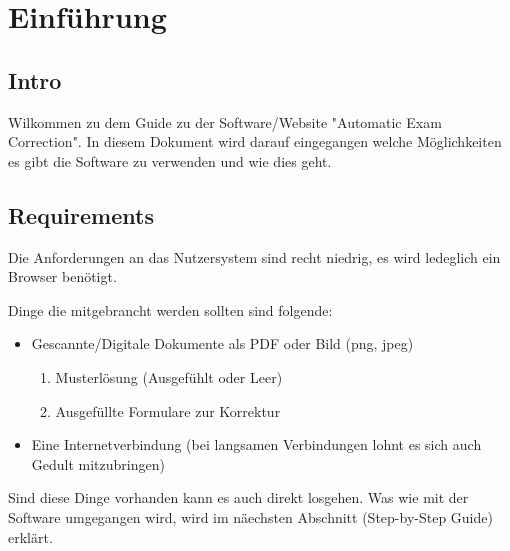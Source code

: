 \chapter{Einf\"uhrung}

\section{Intro}

Wilkommen zu dem Guide zu der Software/Website "Automatic Exam Correction".
In diesem Dokument wird darauf eingegangen welche M\"oglichkeiten es gibt die Software zu verwenden und wie dies geht.

\section{Requirements}

Die Anforderungen an das Nutzersystem sind recht niedrig, es wird ledeglich ein Browser ben\"otigt.

Dinge die mitgebrancht werden sollten sind folgende:
\begin{itemize}
	\item Gescannte/Digitale Dokumente als PDF oder Bild (png, jpeg)
		\begin{enumerate}
			\item Musterl\"osung (Ausgef\"uhlt oder Leer)
			\item Ausgef\"ullte Formulare zur Korrektur
		\end{enumerate}
	\item Eine Internetverbindung (bei langsamen Verbindungen lohnt es sich auch Gedult mitzubringen)
\end{itemize}

Sind diese Dinge vorhanden kann es auch direkt losgehen.
Was wie mit der Software umgegangen wird, wird im n\"aechsten Abschnitt (Step-by-Step Guide) erkl\"art. 
